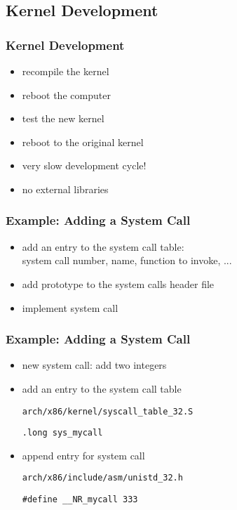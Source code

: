 \documentclass[dvipsnames]{beamer}
\begin{document}
\subsection{Kernel Development}

\begin{frame}
  \frametitle{Kernel Development}

  \begin{itemize}
    \item recompile the kernel
    \item reboot the computer
    \item test the new kernel
    \item reboot to the original kernel

    \bigskip
    \item very slow development cycle!
    \item no external libraries
  \end{itemize}
\end{frame}

\begin{frame}
  \frametitle{Example: Adding a System Call}

  \begin{itemize}
    \item add an entry to the system call table:\\
      system call number, name, function to invoke, ...
    \item add prototype to the system calls header file
    \item implement system call
  \end{itemize}
\end{frame}

\begin{frame}[fragile]
  \frametitle{Example: Adding a System Call}

  \begin{itemize}
    \item new system call: add two integers

    \pause
    \medskip
    \item add an entry to the system call table
    \begin{exampleblock}{\texttt{arch/x86/kernel/syscall\_table\_32.S}}
      \begin{lstlisting}
.long sys_mycall
      \end{lstlisting}
    \end{exampleblock}

    \pause
    \medskip
    \item append entry for system call
    \begin{exampleblock}{\texttt{arch/x86/include/asm/unistd\_32.h}}
      \begin{lstlisting}
#define __NR_mycall 333
      \end{lstlisting}
    \end{exampleblock}
  \end{itemize}
\end{frame}
\end{document}
